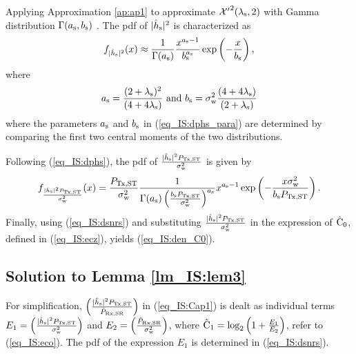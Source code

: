 {\begin{IEEEproof}[Solution]
Applying Approximation \ref{ap:ap1} to approximate $\ncchi2(\ls, 2)$ with Gamma distribution $\Gamma(a_{\text{s}}, b_{\text{s}})$ \cite{abramo}. The pdf of $|\hat{h}_{\text{s}}|^2$ is characterized as  
\begin{align}
f_{|\hat{h}_{\text{s}}|^2}(x) \approx \frac{1}{\Gamma(a_{\text{s}})} \frac{x^{a_{\text{s}} - 1}}{b_{\text{s}}^{a_{\text{s}}}} \exp\left(-\frac{x}{b_{\text{s}}}\right), 
\label{eq_IS:dphs}
\end{align}
where
\begin{align}
a_{\text{s}} = \frac{(2 + \lambda_{\text{s}})^2}{(4 + 4\lambda_{\text{s}})} \text{ and }  b_{\text{s}} = \sigma^2_{\text{w}} \frac{(4 + 4\lambda_{\text{s}})}{(2 + \lambda_{\text{s}})} \label{eq_IS:dphs_para}
\end{align} 
where the parameters $a_{\text{s}}$ and $b_{\text{s}}$ in (\ref{eq_IS:dphs_para}) are determined by comparing the first two central moments of the two distributions. 

Following (\ref{eq_IS:dphs}), the pdf of $\frac{|\hat{h}_{\text{s}}|^2P_{\text{Tx,ST}}}{\sigma^2_{\text{w}}}$ is given by 
\begin{align}
f_{\frac{ |\hat{h}_{\text{s}}|^2 P_{\text{Tx,ST}}}{\sigma^2_{\text{w}}}}(x) =  \frac{P_{\text{Tx,ST}}}{\sigma^2_{\text{w}}} \frac{1}{\Gamma(a_{\text{s}}) \left(\frac{b_{\text{s}} P_{\text{Tx,ST}}}{\sigma^2_{\text{w}}}\right)^{a_{\text{s}}}} x^{a_{\text{s}} - 1} \exp\left(-\frac{x \sigma^2_{\text{w}}}{ b_{\text{s}} P_{\text{Tx,ST}}}\right). \label{eq_IS:dsnrs}
\end{align}
Finally, using (\ref{eq_IS:dsnrs}) and substituting $\frac{|\hat{h}_{\text{s}}|^2P_{\text{Tx,ST}}}{\sigma^2_{\text{w}}}$ in the expression of $\hat{\text{C}}_{\text{0}}$, defined in (\ref{eq_IS:ecz}), yields (\ref{eq_IS:den_C0}). 
\end{IEEEproof}

\subsection{Solution to Lemma \ref{lm_IS:lem3}} \label{ssec_IS:lem3} 
\begin{IEEEproof}[Solution]
For simplification, $\left( \frac{|\hat{h}_{\text{s}}|^2 P_{\text{Tx,ST}}}{\hat{P}_{\text{Rx,SR}}} \right)$ in (\ref{eq_IS:Cap1}) is dealt as individual terms $E_1 = \left( \frac{|\hat{h}_{\text{s}}|^2 P_{\text{Tx,ST}}}{\sigma^2_{\text{w}}} \right)$ and $E_2 = \left(\frac{\hat{P}_{\text{Rx,SR}}}{\sigma^2_{\text{w}}} \right)$, where $\hat{\text{C}}_{\text{1}} = \log_2 \left(1 + \frac{E_1}{E_2} \right)$, refer to (\ref{eq_IS:eco}). The pdf of the expression $E_1$ is determined in (\ref{eq_IS:dsnrs}).


\end{IEEEproof}}
